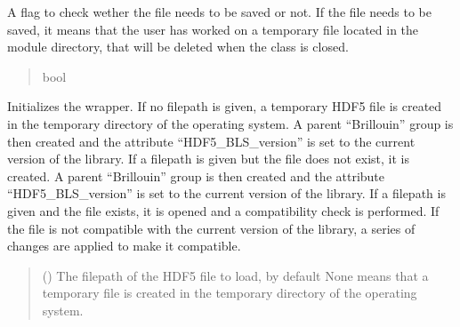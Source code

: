 \documentclass[letterpaper,10pt,english]{sphinxmanual}
\begin{document}
\begin{fulllineitems}
\begin{fulllineitems}
\begin{quote}
\begin{description}
\end{description}\end{quote}

\end{fulllineitems}


\begin{fulllineitems}
\label{\detokenize{source/_autosummary/HDF5_BLS.Wrapper:HDF5_BLS.Wrapper.save}}
\pysigstartsignatures
\pysigline
{}
\pysigstopsignatures
\sphinxAtStartPar
A flag to check wether the file needs to be saved or not. If the file needs to be saved, it means that the user has worked on a temporary file located in the module directory, that will be deleted when the class is closed.
\begin{quote}\begin{description}
\sphinxAtStartPar
bool

\end{description}\end{quote}

\end{fulllineitems}


\begin{fulllineitems}
\label{\detokenize{source/_autosummary/HDF5_BLS.Wrapper:HDF5_BLS.Wrapper.__init__}}
\pysigstartsignatures
\pysiglinewithargsret
{}
{}
{}
\pysigstopsignatures
\sphinxAtStartPar
Initializes the wrapper.
If no filepath is given, a temporary HDF5 file is created in the temporary directory of the operating system. A parent “Brillouin” group is then created and the attribute “HDF5\_BLS\_version” is set to the current version of the library.
If a filepath is given but the file does not exist, it is created. A parent “Brillouin” group is then created and the attribute “HDF5\_BLS\_version” is set to the current version of the library.
If a filepath is given and the file exists, it is opened and a compatibility check is performed. If the file is not compatible with the current version of the library, a series of changes are applied to make it compatible.
\begin{quote}\begin{description}
\sphinxAtStartPar
{} (\sphinxstyleliteralemphasis{\sphinxupquote{, }}) \textendash{} The filepath of the HDF5 file to load, by default None means that a temporary file is created in the temporary directory of the operating system.


\end{description}
\end{quote}
\end{fulllineitems}
\end{fulllineitems}
\end{document}
